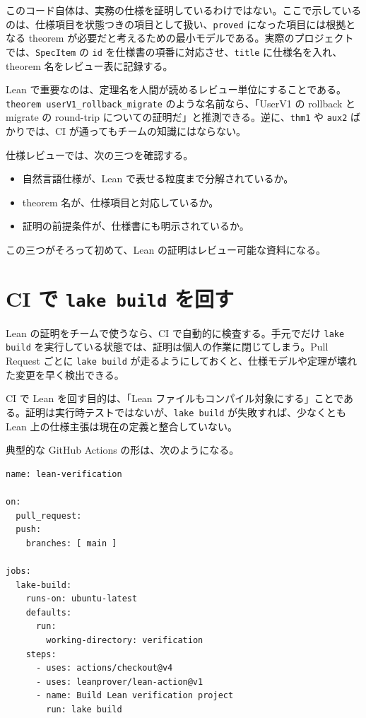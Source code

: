 このコード自体は、実務の仕様を証明しているわけではない。ここで示しているのは、仕様項目を状態つきの項目として扱い、\texttt{proved} になった項目には根拠となる theorem が必要だと考えるための最小モデルである。実際のプロジェクトでは、\texttt{SpecItem} の \texttt{id} を仕様書の項番に対応させ、\texttt{title} に仕様名を入れ、theorem 名をレビュー表に記録する。

\begin{leanbox}
Lean で重要なのは、定理名を人間が読めるレビュー単位にすることである。\texttt{theorem userV1\_rollback\_migrate} のような名前なら、「UserV1 の rollback と migrate の round-trip についての証明だ」と推測できる。逆に、\texttt{thm1} や \texttt{aux2} ばかりでは、CI が通ってもチームの知識にはならない。
\end{leanbox}

仕様レビューでは、次の三つを確認する。

\begin{itemize}
\item 自然言語仕様が、Lean で表せる粒度まで分解されているか。
\item theorem 名が、仕様項目と対応しているか。
\item 証明の前提条件が、仕様書にも明示されているか。
\end{itemize}

この三つがそろって初めて、Lean の証明はレビュー可能な資料になる。

\section{CI で \texttt{lake build} を回す}

Lean の証明をチームで使うなら、CI で自動的に検査する。手元でだけ \texttt{lake build} を実行している状態では、証明は個人の作業に閉じてしまう。Pull Request ごとに \texttt{lake build} が走るようにしておくと、仕様モデルや定理が壊れた変更を早く検出できる。

\begin{softwarebox}
CI で Lean を回す目的は、「Lean ファイルもコンパイル対象にする」ことである。証明は実行時テストではないが、\texttt{lake build} が失敗すれば、少なくとも Lean 上の仕様主張は現在の定義と整合していない。
\end{softwarebox}

典型的な GitHub Actions の形は、次のようになる。

\begin{listing}[htbp]
\begin{verbatim}
name: lean-verification

on:
  pull_request:
  push:
    branches: [ main ]

jobs:
  lake-build:
    runs-on: ubuntu-latest
    defaults:
      run:
        working-directory: verification
    steps:
      - uses: actions/checkout@v4
      - uses: leanprover/lean-action@v1
      - name: Build Lean verification project
        run: lake build
\end{verbatim}
\caption{CI で lake build を呼ぶ例}
\label{lst:ch30-ci-build}
\end{listing}

